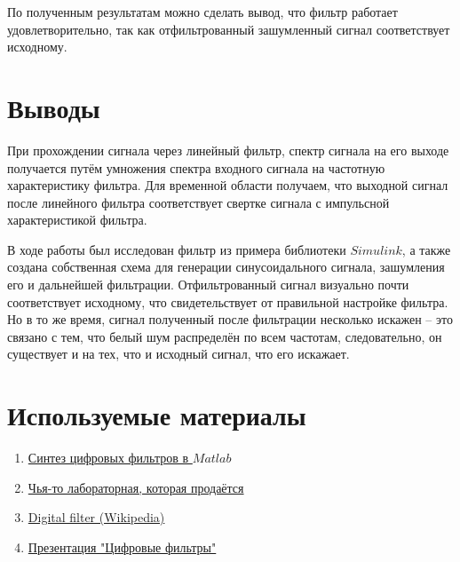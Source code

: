 \documentclass[a4paper,14pt]{extarticle}
\begin{document}
По полученным результатам можно сделать вывод, что фильтр работает удовлетворительно, так как отфильтрованный зашумленный сигнал соответствует исходному.



\section{Выводы}

При прохождении сигнала через линейный фильтр, спектр сигнала на его выходе получается путём умножения спектра входного сигнала на частотную характеристику фильтра. Для временной области получаем, что выходной сигнал после линейного фильтра соответствует свертке сигнала с импульсной характеристикой фильтра. 

В ходе работы был исследован фильтр из примера библиотеки $Simulink$, а также создана собственная схема для генерации синусоидального сигнала, зашумления его и дальнейшей фильтрации. Отфильтрованный сигнал визуально почти соответствует исходному, что свидетельствует от правильной настройке фильтра. Но в то же время, сигнал полученный после фильтрации несколько искажен -- это связано с тем, что белый шум распределён по всем частотам, следовательно, он существует и на тех, что и исходный сигнал, что его искажает.

\section{Используемые материалы}

\begin{enumerate}

\item \href{http://www.kit-e.ru/articles/cad/2009_05_127}{Синтез цифровых фильтров в $Matlab$}

\item \href{https://vunivere.ru/work11332}{Чья-то лабораторная, которая продаётся}

\item \href{https://en.wikipedia.org/wiki/Digital_filter}{Digital filter (Wikipedia)}

\item \href{http://present5.com/cifrovye-filtry-chast-1-linejnost-i-stacionarnost/}{Презентация "Цифровые фильтры"}

\end{enumerate}
\end{document}
